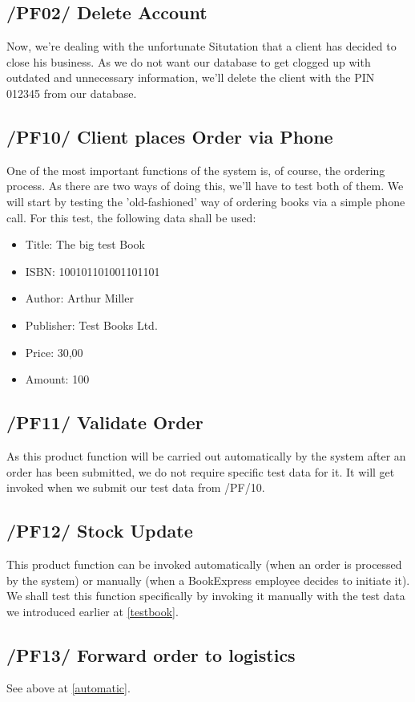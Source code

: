 \documentclass[11pt,a4paper,oneside,svgnames]{report}
\begin{document}
\subsection{/PF02/ Delete Account}
Now, we're dealing with the unfortunate Situtation that a client has decided to close his business. As we do not want our database to get clogged up with outdated and unnecessary information, we'll delete the client with the PIN 012345 from our database.
\subsection{/PF10/ Client places Order via Phone}
One of the most important functions of the system is, of course, the ordering process. As there are two ways of doing this, we'll have to test both of them. We will start by testing the 'old-fashioned' way of ordering books via a simple phone call. For this test, the following data shall be used:
\begin{itemize}
\label{testbook}
\item{Title: The big test Book}
\item{ISBN: 100101101001101101}
\item{Author: Arthur Miller}
\item{Publisher: Test Books Ltd.}
\item{Price: 30,00}
\item{Amount: 100}
\end{itemize}
\subsection{/PF11/ Validate Order}
\label{automatic1}
As this product function will be carried out automatically by the system after an order has been submitted, we do not require specific test data for it. It will get invoked when we submit our test data from /PF/10.
\subsection{/PF12/ Stock Update}
This product function can be invoked automatically (when an order is processed by the system) or manually (when a BookExpress employee decides to initiate it). 
We shall test this function specifically by invoking it manually with the test data we introduced earlier at \ref{testbook}.
\subsection{/PF13/ Forward order to logistics}
See above at \ref{automatic}.
\end{document}
